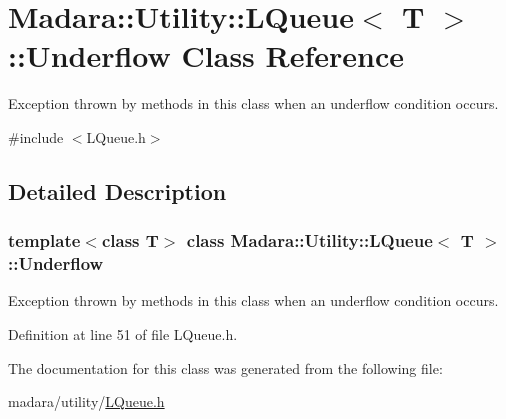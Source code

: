 \hypertarget{classMadara_1_1Utility_1_1LQueue_1_1Underflow}{
\section{Madara::Utility::LQueue$<$ T $>$::Underflow Class Reference}
\label{da/da3/classMadara_1_1Utility_1_1LQueue_1_1Underflow}
}


Exception thrown by methods in this class when an underflow condition occurs.  




{\ttfamily \#include $<$LQueue.h$>$}



\subsection{Detailed Description}
\subsubsection*{template$<$class T$>$ class Madara::Utility::LQueue$<$ T $>$::Underflow}

Exception thrown by methods in this class when an underflow condition occurs. 

Definition at line 51 of file LQueue.h.



The documentation for this class was generated from the following file:\begin{DoxyCompactItemize}
\item 
madara/utility/\hyperlink{LQueue_8h}{LQueue.h}\end{DoxyCompactItemize}

